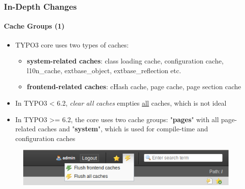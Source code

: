 \begin{frame}[fragile]
	\frametitle{In-Depth Changes}
	\framesubtitle{Cache Groups (1)}

	\begin{itemize}
		\item TYPO3 core uses two types of caches:

			\begin{itemize}
				\item \textbf{system-related caches}:
				class loading cache, configuration cache, l10n\_cache, extbase\_object, extbase\_reflection etc.
				\item \textbf{frontend-related caches}:
				cHash cache, page cache, page section cache
			\end{itemize}

		\item In TYPO3 < 6.2, \textit{clear all caches} empties \underline{all} caches, which is not ideal

		\item In TYPO3 >= 6.2, the core uses two cache groups:\newline
			"\textbf{pages}" with all page-related caches and "\textbf{system}", which is used for compile-time and configuration caches

	\end{itemize}

	\begin{figure}
		\includegraphics[width=0.5\linewidth]{Images/InDepthChanges/CacheGroups.png}
	\end{figure}

\end{frame}


